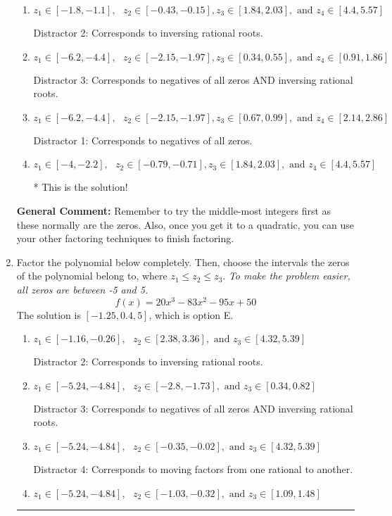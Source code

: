 \documentclass{extbook}[14pt]
\newcommand{\litem}[1]{\item #1

\rule{\textwidth}{0.4pt}}
\begin{document}
\begin{enumerate}
{\begin{enumerate}[label=\Alph*.]
 Distractor 4: Corresponds to moving factors from one rational to another.
\item \( z_1 \in [-1.8, -1.1], \text{   }  z_2 \in [-0.43, -0.15], z_3 \in [1.84, 2.03], \text{   and   } z_4 \in [4.4, 5.57] \)

 Distractor 2: Corresponds to inversing rational roots.
\item \( z_1 \in [-6.2, -4.4], \text{   }  z_2 \in [-2.15, -1.97], z_3 \in [0.34, 0.55], \text{   and   } z_4 \in [0.91, 1.86] \)

 Distractor 3: Corresponds to negatives of all zeros AND inversing rational roots.
\item \( z_1 \in [-6.2, -4.4], \text{   }  z_2 \in [-2.15, -1.97], z_3 \in [0.67, 0.99], \text{   and   } z_4 \in [2.14, 2.86] \)

 Distractor 1: Corresponds to negatives of all zeros.
\item \( z_1 \in [-4, -2.2], \text{   }  z_2 \in [-0.79, -0.71], z_3 \in [1.84, 2.03], \text{   and   } z_4 \in [4.4, 5.57] \)

* This is the solution!
\end{enumerate}

\textbf{General Comment:} Remember to try the middle-most integers first as these normally are the zeros. Also, once you get it to a quadratic, you can use your other factoring techniques to finish factoring.
}
\litem{
Factor the polynomial below completely. Then, choose the intervals the zeros of the polynomial belong to, where $z_1 \leq z_2 \leq z_3$. \textit{To make the problem easier, all zeros are between -5 and 5.}
\[ f(x) = 20x^{3} -83 x^{2} -95 x + 50 \]The solution is \( [-1.25, 0.4, 5] \), which is option E.\begin{enumerate}[label=\Alph*.]
\item \( z_1 \in [-1.16, -0.26], \text{   }  z_2 \in [2.38, 3.36], \text{   and   } z_3 \in [4.32, 5.39] \)

 Distractor 2: Corresponds to inversing rational roots.
\item \( z_1 \in [-5.24, -4.84], \text{   }  z_2 \in [-2.8, -1.73], \text{   and   } z_3 \in [0.34, 0.82] \)

 Distractor 3: Corresponds to negatives of all zeros AND inversing rational roots.
\item \( z_1 \in [-5.24, -4.84], \text{   }  z_2 \in [-0.35, -0.02], \text{   and   } z_3 \in [4.32, 5.39] \)

 Distractor 4: Corresponds to moving factors from one rational to another.
\item \( z_1 \in [-5.24, -4.84], \text{   }  z_2 \in [-1.03, -0.32], \text{   and   } z_3 \in [1.09, 1.48] \)


\end{enumerate}}
\end{enumerate}
\end{document}
